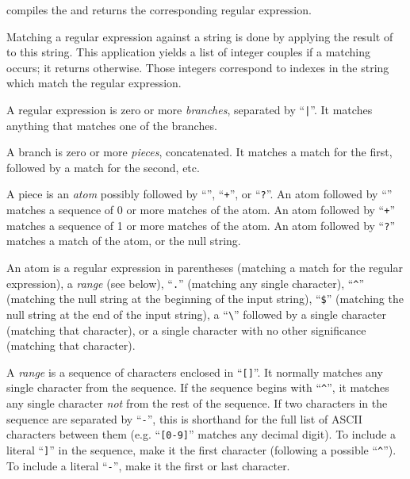 \begin{entry}{
}
\saut
{} compiles the  and returns the
corresponding regular expression.

\smallskip
Matching a regular expression against a string is done by applying the result
of  to this string. This application yields a list of
integer couples if a matching occurs; it returns {\schfalse} otherwise.  Those
integers correspond to indexes in the string which match the regular
expression.

A regular expression is zero or more {\em branches}, separated by ``{\tt |}''.  It
matches anything that matches one of the branches.

A branch is zero or more {\em pieces}, concatenated.  It matches a match for
the first, followed by a match for the second, etc.

A piece is an {\em atom} possibly followed by ``{\tt *}'', ``{\tt +}'', or
``{\tt ?}''. An atom followed by ``{\tt *}'' matches a sequence of 0 or more
matches of the atom.  An atom followed by ``{\tt +}'' matches a sequence of 1
or more matches of the atom.  An atom followed by ``{\tt ?}'' matches a match
of the atom, or the null string.

An atom is a regular expression in parentheses (matching a match for the
regular expression), a {\em range} (see below), ``{\tt .}''  (matching any
single character), ``{\tt \verb+^+}'' (matching the null string at the
beginning of the input string), ``{\tt \verb|$|}'' %
(matching the null string
at the end of the input string), a ``{\tt \verb+\+}'' followed by a single
character (matching that character), or a single character with no other
significance (matching that character).

A {\em range} is a sequence of characters enclosed in ``{\tt []}''.  It
normally matches any single character from the sequence.  If the sequence
begins with ``{\tt \verb+^+}'', it matches any single character {\em not} from
the rest of the sequence.  If two characters in the sequence are separated by
``{\tt -}'', this is shorthand for the full list of ASCII characters between
them (e.g. ``{\tt [0-9]}'' matches any decimal digit).  To include a literal
``{\tt ]}'' in the sequence, make it the first character (following a possible
``{\tt \verb+^+}'').  To include a literal ``{\tt -}'', make it the first or
last character.


\end{entry}
